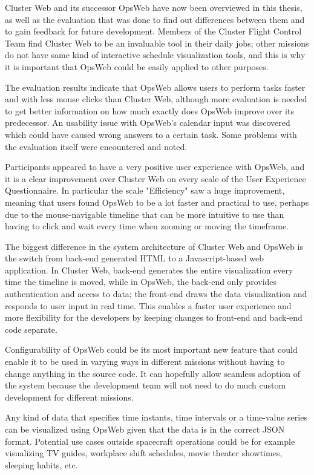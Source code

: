 
Cluster Web and its successor OpsWeb have now been overviewed in this thesis, as well as the evaluation that was done to find out differences between them and to gain feedback for future development. Members of the Cluster Flight Control Team find Cluster Web to be an invaluable tool in their daily jobs; other missions do not have same kind of interactive schedule visualization tools, and this is why it is important that OpsWeb could be easily applied to other purposes.

The evaluation results indicate that OpsWeb allows users to perform tasks faster and with less mouse clicks than Cluster Web, although more evaluation is needed to get better information on how much exactly does OpsWeb improve over its predecessor. An usability issue with OpsWeb's calendar input was discovered which could have caused wrong answers to a certain task. Some problems with the evaluation itself were encountered and noted.

Participants appeared to have a very positive user experience with OpsWeb, and it is a clear improvement over Cluster Web on every scale of the User Experience Questionnaire. In particular the scale "Efficiency" saw a huge improvement, meaning that users found OpsWeb to be a lot faster and practical to use, perhaps due to the mouse-navigable timeline that can be more intuitive to use than having to click and wait every time when zooming or moving the timeframe.

The biggest difference in the system architecture of Cluster Web and OpsWeb is the switch from back-end generated HTML to a Javascript-based web application. In Cluster Web, back-end generates the entire visualization every time the timeline is moved, while in OpsWeb, the back-end only provides authentication and access to data; the front-end draws the data visualization and responds to user input in real time. This enables a faster user experience and more flexibility for the developers by keeping changes to front-end and back-end code separate.

Configurability of OpsWeb could be its most important new feature that could enable it to be used in varying ways in different missions without having to change anything in the source code. It can hopefully allow seamless adoption of the system because the development team will not need to do much custom development for different missions. 

Any kind of data that specifies time instants, time intervals or a time-value series can be visualized using OpsWeb given that the data is in the correct JSON format. Potential use cases outside spacecraft operations could be for example visualizing TV guides, workplace shift schedules, movie theater showtimes, sleeping habits, etc.

